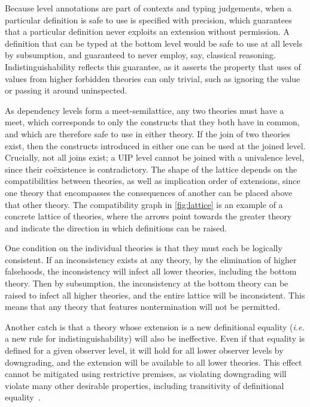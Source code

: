 \documentclass{article}
\makeatletter
\newcommand{\ie}{\textit{i.e.}\@\xspace}
\makeatother
\begin{document}
Because level annotations are part of contexts and typing judgements,
when a particular definition is safe to use is specified with precision,
which guarantees that a particular definition never exploits an extension without permission.
A definition that can be typed at the bottom level
would be safe to use at all levels by subsumption,
and guaranteed to never employ, say, classical reasoning.
Indistinguishability reflects this guarantee, as it asserts the property that
uses of values from higher forbidden theories can only trivial,
such as ignoring the value or passing it around uninspected.

As dependency levels form a meet-semilattice,
any two theories must have a meet,
which corresponds to only the constructs that they both have in common,
and which are therefore safe to use in either theory.
If the join of two theories exist,
then the constructs introduced in either one can be used at the joined level.
Crucially, not all joins exist; a UIP level cannot be joined with a univalence level,
since their co\"existence is contradictory.
The shape of the lattice depends on the compatibilities between theories,
as well as implication order of extensions,
since one theory that encompasses the consequences of another
can be placed above that other theory.
The compatibility graph in \cref{fig:lattice}
is an example of a concrete lattice of theories,
where the arrows point towards the greater theory
and indicate the direction in which definitions can be raised.

One condition on the individual theories is that they must each be logically consistent.
If an inconsistency exists at any theory,
by the elimination of higher falsehoods,
the inconsistency will infect all lower theories, including the bottom theory.
Then by subsumption, the inconsistency at the bottom theory
can be raised to infect all higher theories,
and the entire lattice will be inconsistent.
This means that any theory that features nontermination will not be permitted.

Another catch is that a theory whose extension is a new definitional equality
(\ie a new rule for indistinguishability) will also be ineffective.
Even if that equality is defined for a given observer level,
it will hold for all lower observer levels by downgrading,
and the extension will be available to all lower theories.
This effect cannot be mitigated using restrictive premises,
as violating downgrading will violate many other desirable properties,
including transitivity of definitional equality~\citep{dcoi-omega}.
\end{document}
